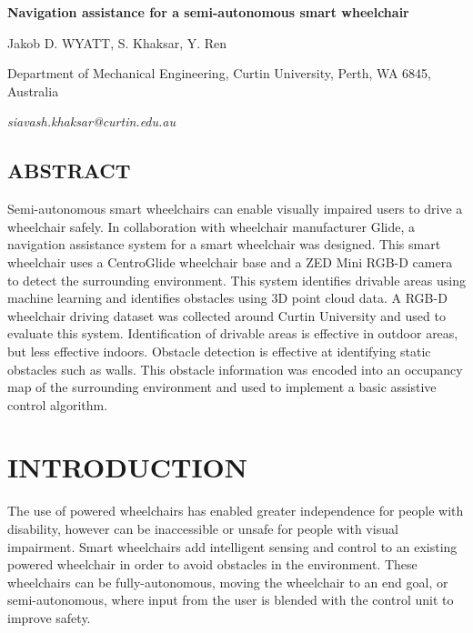\documentclass[10pt,twoside]{article}
\begin{document}
\begin{center}
\fontsize{12}{14.4}\selectfont
\textbf{Navigation assistance for a semi-autonomous smart wheelchair}
\fontsize{11}{13.2}\selectfont

\vspace{11pt}

Jakob D. WYATT, S. Khaksar, Y. Ren

\vspace{11pt}

Department of Mechanical Engineering, Curtin University, Perth, WA 6845, Australia

\vspace{11pt}

\end{center}
\begin{flushright}
\textit{siavash.khaksar@curtin.edu.au}
\end{flushright}

\begin{adjustwidth}{10mm}{10mm}
\section*{\textbf{ABSTRACT}}
Semi-autonomous smart wheelchairs can enable visually impaired users to drive a wheelchair
safely. In collaboration with wheelchair manufacturer Glide, a navigation assistance system for a
smart wheelchair was designed. This smart wheelchair uses a CentroGlide wheelchair
base and a ZED Mini RGB-D camera to detect the surrounding environment.
This system identifies drivable areas using machine learning
and identifies obstacles using 3D point cloud data. A RGB-D wheelchair driving dataset was
collected around Curtin University and used to evaluate this system. Identification of drivable
areas is effective in outdoor areas, but less effective indoors. Obstacle detection
is effective at identifying static obstacles such as walls. This obstacle information
was encoded into an occupancy map of the surrounding environment and used to
implement a basic assistive control algorithm.
\end{adjustwidth}

\section*{\textbf{INTRODUCTION}}
The use of powered wheelchairs has enabled greater independence for people with disability,
however can be inaccessible or unsafe for people with visual impairment.
Smart wheelchairs add intelligent sensing and control to an existing powered wheelchair
in order to avoid obstacles in the environment. These wheelchairs can be fully-autonomous, moving the wheelchair
to an end goal, or semi-autonomous, where input from the user is blended with the control unit to improve safety.
\end{document}
